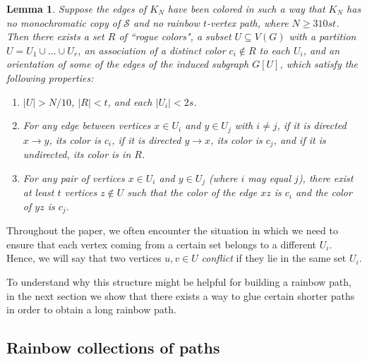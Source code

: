 \documentclass[a4paper,11pt]{article}
\newtheorem{lemma}[theorem]{\bf Lemma}
\theoremstyle{definition}
\def\cS{\mathcal{S}}
\begin{document}
\begin{lemma}\label{lemma:substructure}
Suppose the edges of $K_N$ have been colored in such a way that $K_N$ has no
monochromatic copy of $\cS$ and no rainbow $t$-vertex path, where $N\geq 310 st$.
Then there exists a set $R$ of ``rogue colors", a subset $U \subseteq V (G)$ with a partition $U = U_1\cup \dots\cup U_r$, an association of a distinct color $c_i \notin R$ to each $U_i$, and an orientation of some of the edges of the induced subgraph $G[U]$, which satisfy the following properties:
\begin{enumerate}[label=(\roman*)]
    \item $|U| > N/10$, $|R| < t$, and each $|U_i| < 2s$.
    \item For any edge between vertices $x \in U_i$ and $y \in U_j$ with $i \neq  j$, if it is directed $x\to y$, its color is $c_i$, if it is directed $y\to x$, its color is $c_j$, and if it is undirected, its color is in $R$.
    \item For any pair of vertices $x \in U_i$ and $y \in U_j$ (where $i$ may equal $j$), there exist at least $t$ vertices $z \notin U$ such that the color of the edge $xz$ is $c_i$ and the color of $yz$ is $c_j$. 
\end{enumerate}
\end{lemma}

Throughout the paper, we often encounter the situation in which we need to ensure that each vertex coming from a certain set belongs to a different $U_i$. Hence, we will say that two vertices $u, v\in U$ \emph{conflict} if they lie in the same set $U_i$.

To understand why this structure might be helpful for building a rainbow path, in the next section we show that there exists a way to glue certain shorter paths in order to obtain a long rainbow path. 

\subsection{Rainbow collections of paths}
\end{document}
